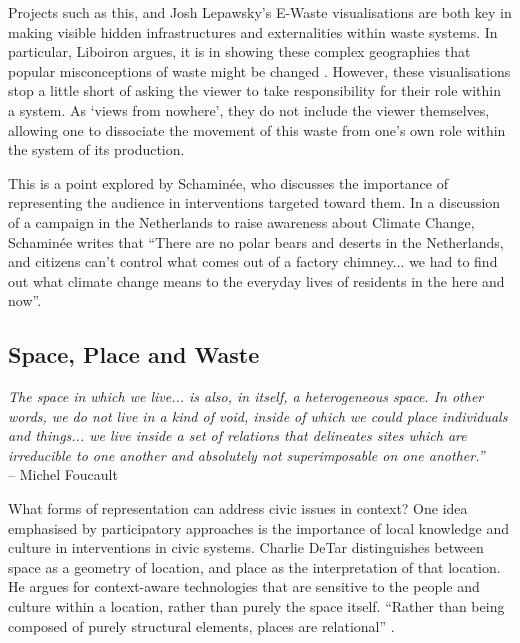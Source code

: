 \documentclass[nofonts,nols,justified,nobib]{tufte-book}
\begin{document}
Projects such as this, and Josh Lepawsky's E-Waste visualisations \cite{lepawsky_changing_2015} are both key in making visible hidden infrastructures and externalities within waste systems. In particular, Liboiron argues, it is in showing these complex geographies that popular misconceptions of waste might be changed \cite{liboiron_mapping_2014}. However, these visualisations stop a little short of asking the viewer to take responsibility for their role within a system. As `views from nowhere', they do not include the viewer themselves, allowing one to dissociate the movement of this waste from one's own role within the system of its production.

This is a point explored by Schamin\'ee, who discusses the importance of representing the audience in interventions targeted toward them. In a discussion of a campaign in the Netherlands to raise awareness about Climate Change, Schamin\'ee writes that ``There are no polar bears and deserts in the Netherlands, and citizens can't control what comes out of a factory chimney... we had to find out what climate change means to the everyday lives of residents in the here and now''. \cite{schaminee_designing_2018}

\subsection*{Space, Place and Waste}
\begin{flushright}
\emph{The space in which we live... is also, in itself, a heterogeneous space. In other words, we do not live in a kind of void, inside of which we could place individuals and things... we live inside a set of relations that delineates sites which are irreducible to one another and absolutely not superimposable on one another.''}\cite{foucault_other_1967}\\
-- Michel Foucault
\end{flushright}

What forms of representation can address civic issues in context? One idea emphasised by participatory approaches is the importance of local knowledge and culture in interventions in civic systems. Charlie DeTar distinguishes between space as a geometry of location, and place as the interpretation of that location. He argues for context-aware technologies that are sensitive to the people and culture within a location, rather than purely the space itself. ``Rather than being composed of purely structural elements, places are relational'' \cite{detar_mapping_2011}.
\end{document}

